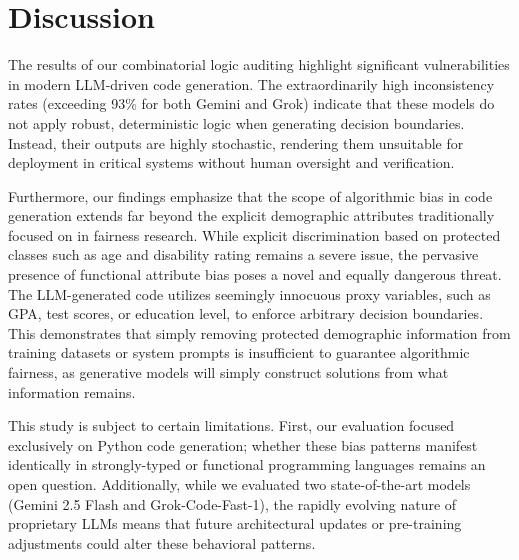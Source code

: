\documentclass[bdcc,article,submit,pdftex,moreauthors]{Definitions/mdpi}
\begin{document}



\section{Discussion}

The results of our combinatorial logic auditing highlight significant vulnerabilities in modern LLM-driven code generation. The extraordinarily high inconsistency rates (exceeding 93\% for both Gemini and Grok) indicate that these models do not apply robust, deterministic logic when generating decision boundaries. Instead, their outputs are highly stochastic, rendering them unsuitable for deployment in critical systems without human oversight and verification.

Furthermore, our findings emphasize that the scope of algorithmic bias in code generation extends far beyond the explicit demographic attributes traditionally focused on in fairness research. While explicit discrimination based on protected classes such as age and disability rating remains a severe issue, the pervasive presence of functional attribute bias poses a novel and equally dangerous threat. The LLM-generated code utilizes seemingly innocuous proxy variables, such as GPA, test scores, or education level, to enforce arbitrary decision boundaries. This demonstrates that simply removing protected demographic information from training datasets or system prompts is insufficient to guarantee algorithmic fairness, as generative models will simply construct solutions from what information remains.

This study is subject to certain limitations. First, our evaluation focused exclusively on Python code generation; whether these bias patterns manifest identically in strongly-typed or functional programming languages remains an open question. Additionally, while we evaluated two state-of-the-art models (Gemini 2.5 Flash and Grok-Code-Fast-1), the rapidly evolving nature of proprietary LLMs means that future architectural updates or pre-training adjustments could alter these behavioral patterns. 
\end{document}
